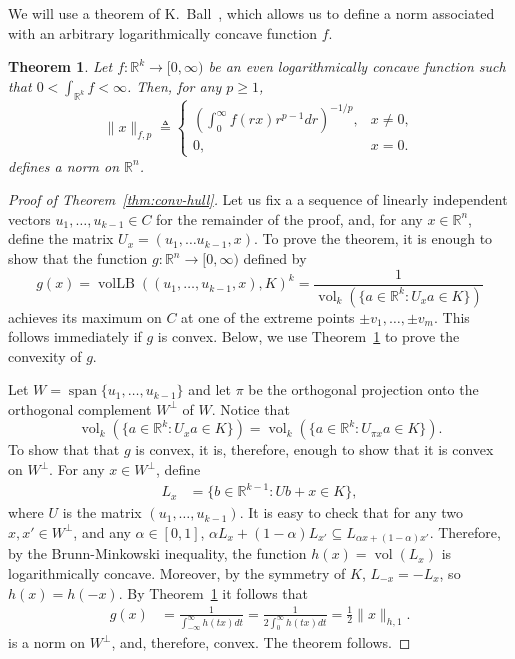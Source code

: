 \documentclass[11pt]{article}
\newtheorem{theorem}{Theorem}
\newcommand{\R}{{\mathbb{R}}}
\newcommand{\T}{\mathsf T}
\newcommand{\eqdef}{\triangleq}
\DeclareMathOperator{\vollb}{volLB}
\DeclareMathOperator{\vol}{vol}
\DeclareMathOperator{\lspan}{span}
\begin{document}
We will use a theorem of K.~Ball~\cite{Ball88}, which allows us to
define a norm associated with an arbitrary logarithmically concave
function $f$.
\begin{theorem}\label{thm:ball-logconcave}
  Let $f: \R^k \to [0, \infty)$ be an even logarithmically concave
  function such that $0 < \int_{\R^k} f < \infty$. Then, for any $p
  \ge 1$, 
  \[
  \|x\|_{f,p} \eqdef 
  \begin{cases}
    \left(\int_0^\infty f(rx) r^{p-1}dr\right)^{-1/p}, &x \neq 0,\\
    0, &x = 0.
  \end{cases}
  \]
  defines a norm on $\R^n$. 
\end{theorem}


\begin{proof}[Proof of Theorem~\ref{thm:conv-hull}]
  Let us fix a a sequence of linearly independent vectors $u_1,
  \ldots, u_{k-1} \in C$ for the remainder of the proof,
  and, for any $x\in \R^n$, define the matrix $U_x = (u_1, \ldots
  u_{k-1}, x)$.  To prove the theorem, it is enough to show that the
  function $g: \R^n \to [0, \infty)$ defined by
  \[
  g(x) = \vollb((u_1, \ldots, u_{k-1}, x), K)^k 
  = \frac{1}{\vol_k(\{a \in \R^k: U_x a \in K\})}
  \]
  achieves its maximum on $C$ at one of the extreme points $\pm v_1,
  \ldots, \pm v_m$. This follows immediately if $g$ is
  convex. Below, we use Theorem~\ref{thm:ball-logconcave} to prove the
  convexity of $g$.
  
  Let  $W = \lspan\{u_1, \ldots, u_{k-1}\}$ and let $\pi$ be
  the orthogonal projection onto the orthogonal complement $W^\perp$
  of $W$. Notice that 
  \[
  \vol_k(\{a \in \R^k: U_x a \in K\}) 
  = \vol_k(\{a \in \R^k: U_{\pi x} a \in K\}).
  \]
  To show that that $g$ is convex, it is, therefore, enough to show
  that it is convex on $W^\perp$.  For any $x \in W^\perp$, define 
  \begin{align*}
    L_x &= \{b \in \R^{k-1}: Ub + x \in K\},
  \end{align*}
  where $U$ is the matrix $(u_1, \ldots, u_{k-1})$. It is
  easy to check that for any two $x, x' \in W^\perp$, and any $\alpha
  \in [0,1]$, $\alpha L_{x} + (1-\alpha) L_{x'} \subseteq L_{\alpha x
    + (1-\alpha)x'}$. Therefore, by the Brunn-Minkowski inequality,
  the function $h(x) = \vol(L_x)$ is logarithmically
  concave. Moreover, by the symmetry of $K$, $L_{-x} = -L_x$, so $h(x)
  = h(-x)$.  By Theorem~\ref{thm:ball-logconcave} it follows that 
  \begin{align*}
  g(x) &=\frac{1}{\int_{-\infty}^\infty h(tx) dt}
  = \frac{1}{2\int_{0}^\infty h(tx) dt}
  = \frac{1}{2}\|x\|_{h,1}.
  \end{align*}
  is a norm on $W^\perp$, and, therefore, convex. The theorem follows.
\end{proof}
\end{document}
